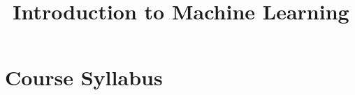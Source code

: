 \documentclass[11pt]{article}
\title{Introduction to Machine Learning}
\date{}
\begin{document}
\maketitle
\section{Course Syllabus}
\begin{center}
\begin{tabular}{|c|c|c|}

\end{tabular}
\end{center}
\end{document}
